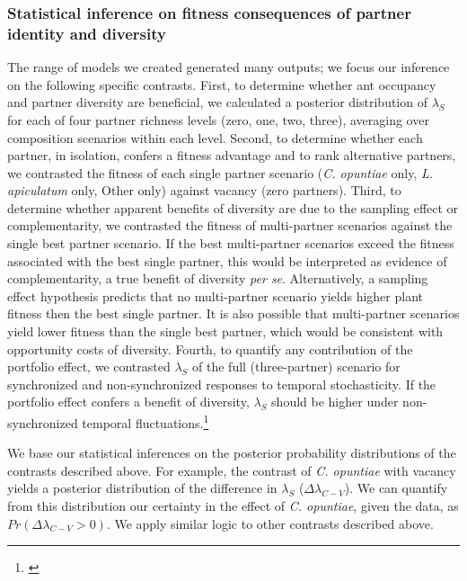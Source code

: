 \documentclass[11pt]{article}
\newcommand{\tom}[2]{{\color{red}{#1}}\footnote{\textit{\color{red}{#2}}}}
\begin{document}
\subsubsection*{Statistical inference on fitness consequences of partner identity and diversity}
The range of models we created generated many outputs; we focus our inference on the following specific contrasts. 
First, to determine whether ant occupancy and partner diversity are beneficial, we calculated a posterior distribution of $\lambda_{S}$ for each of four partner richness levels (zero, one, two, three), averaging over composition scenarios within each level. 
Second, to determine whether each partner, in isolation, confers a fitness advantage and to rank alternative partners, we contrasted the fitness of each single partner scenario (\textit{C. opuntiae} only, \textit{L. apiculatum} only, Other only) against vacancy (zero partners). 
Third, to determine whether apparent benefits of diversity are due to the sampling effect or complementarity, we contrasted the fitness of multi-partner scenarios against the single best partner scenario. 
If the best multi-partner scenarios exceed the fitness associated with the best single partner, this would be interpreted as evidence of complementarity, a true benefit of diversity \emph{per se}. 
Alternatively, a sampling effect hypothesis predicts that no multi-partner scenario yields higher plant fitness then the best single partner. 
It is also possible that multi-partner scenarios yield lower fitness than the single best partner, which would be consistent with opportunity costs of diversity. 
Fourth, to quantify any contribution of the portfolio effect, we contrasted $\lambda_{S}$ of the full (three-partner) scenario for synchronized and non-synchronized responses to temporal stochasticity. 
If the portfolio effect confers a benefit of diversity, $\lambda_{S}$ should be higher under non-synchronized temporal fluctuations.\tom{}{I am actually not sure whether we should look at this as stated, or whether we should compare the difference between all partners and vacancy for synchronous and non-synchronous (which is what I think you currently do.)} 

We base our statistical inferences on the posterior probability distributions of the contrasts described above. 
For example, the contrast of \textit{C. opuntiae} with vacancy yields a posterior distribution of the difference in $\lambda_{S}$ ($\Delta\lambda_{C-V}$). 
We can quantify from this distribution our certainty in the effect of \textit{C. opuntiae}, given the data, as $Pr(\Delta\lambda_{C-V}>0)$. 
We apply similar logic to other contrasts described above. 
\end{document}
